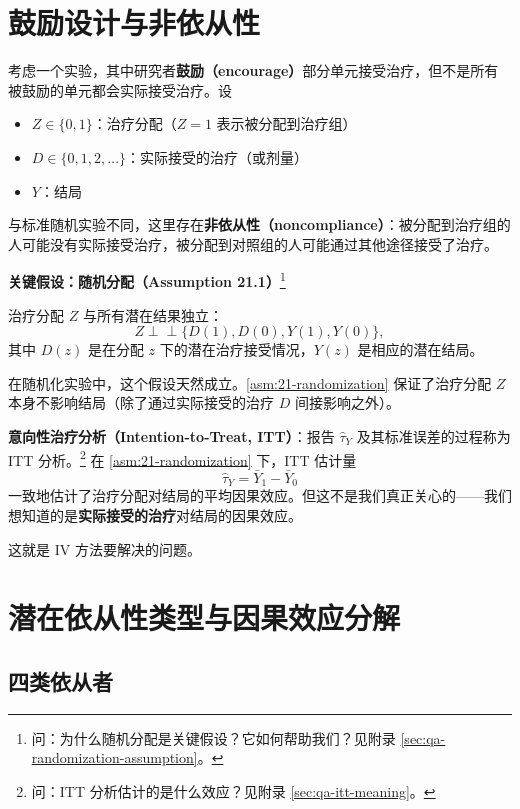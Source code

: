 \section{鼓励设计与非依从性}
\label{sec:21-encouragement}

考虑一个实验，其中研究者\textbf{鼓励（encourage）}部分单元接受治疗，但不是所有被鼓励的单元都会实际接受治疗。设

\begin{itemize}
  \item $Z \in \{0, 1\}$：治疗分配（$Z=1$ 表示被分配到治疗组）
  \item $D \in \{0, 1, 2, \ldots\}$：实际接受的治疗（或剂量）
  \item $Y$：结局
\end{itemize}

与标准随机实验不同，这里存在\textbf{非依从性（noncompliance）}：被分配到治疗组的人可能没有实际接受治疗，被分配到对照组的人可能通过其他途径接受了治疗。

\textbf{关键假设：随机分配（Assumption 21.1）}\footnote{问：为什么随机分配是关键假设？它如何帮助我们？见附录 \cref{sec:qa-randomization-assumption}。}
\begin{Assumption}[随机分配]\label{asm:21-randomization}
治疗分配 $Z$ 与所有潜在结果独立：
\[
Z \perp\!\!\!\perp \{D(1), D(0), Y(1), Y(0)\},
\]
其中 $D(z)$ 是在分配 $z$ 下的潜在治疗接受情况，$Y(z)$ 是相应的潜在结局。
\end{Assumption}

在随机化实验中，这个假设天然成立。\cref{asm:21-randomization} 保证了治疗分配 $Z$ 本身不影响结局（除了通过实际接受的治疗 $D$ 间接影响之外）。

\textbf{意向性治疗分析（Intention-to-Treat, ITT）}：报告 $\hat\tau_Y$ 及其标准误差的过程称为 ITT 分析。\footnote{问：ITT 分析估计的是什么效应？见附录 \cref{sec:qa-itt-meaning}。} 在 \cref{asm:21-randomization} 下，ITT 估计量
\[
\hat\tau_Y = \bar{Y}_1 - \bar{Y}_0
\]
一致地估计了治疗分配对结局的平均因果效应。但这不是我们真正关心的——我们想知道的是\textbf{实际接受的治疗}对结局的因果效应。

这就是 IV 方法要解决的问题。

\section{潜在依从性类型与因果效应分解}
\label{sec:21-latent-compliance}

\subsection{四类依从者}

